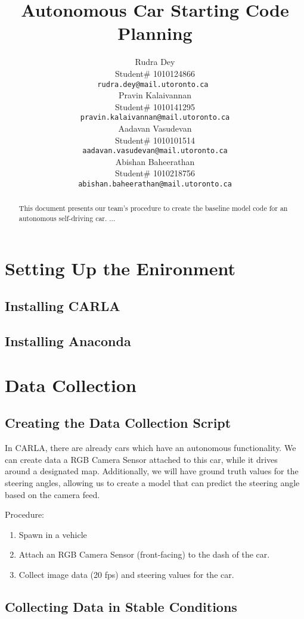 \documentclass{article} %
\title{Autonomous Car Starting Code Planning\\}
\author{Rudra Dey  \\
Student\# 1010124866\\
\texttt{rudra.dey@mail.utoronto.ca } \\
\And
Pravin Kalaivannan  \\
Student\# 1010141295 \\
\texttt{pravin.kalaivannan@mail.utoronto.ca} \\
\AND
Aadavan Vasudevan  \\
Student\# 1010101514 \\
\texttt{aadavan.vasudevan@mail.utoronto.ca} \\
\And
Abishan Baheerathan \\
Student\# 1010218756 \\
\texttt{abishan.baheerathan@mail.utoronto.ca} \\
\AND
}
\begin{document}
\maketitle

\begin{abstract}
This document presents our team's procedure to create the baseline model
code for an autonomous self-driving car. ...\\

\end{abstract}

\section{Setting Up the Enironment}

\subsection{Installing CARLA}

\subsection{Installing Anaconda}


\section{Data Collection}

\subsection{Creating the Data Collection Script}

In CARLA, there are already cars which have an autonomous functionality.
We can create data a RGB Camera Sensor attached to this car, while it drives
around a designated map. Additionally, we will have ground truth values for the steering angles, allowing
us to create a model that can predict the steering angle based on the camera feed.

Procedure:
\begin{enumerate}
  \item{Spawn in a vehicle}
  \item{Attach an RGB Camera Sensor (front-facing) to the dash of the car.}
  \item{Collect image data (20 fps) and steering values for the car.}
\end{enumerate}

\subsection{Collecting Data in Stable Conditions}
\end{document}
